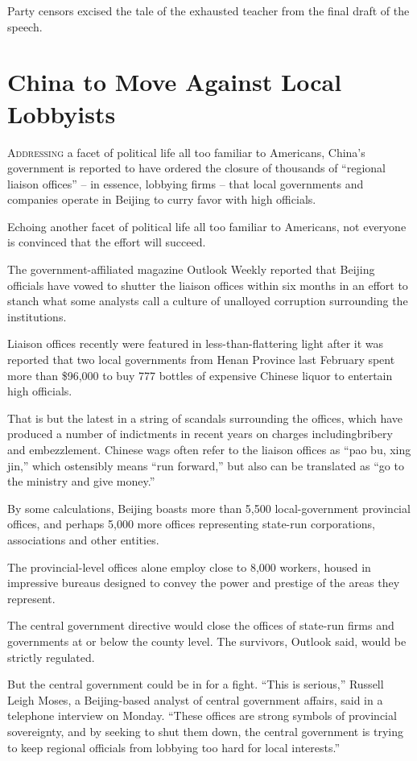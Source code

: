 ﻿\documentclass[12pt]{article}
\begin{document}
Party censors excised the tale of the exhausted teacher from the final draft of the speech.

\section{China to Move Against Local Lobbyists}

\lettrine{A}{ddressing} a facet of political life all too familiar to
Americans, China's government is reported to have ordered the closure of thousands of ``regional
liaison offices'' -- in essence, lobbying firms -- that local governments and companies operate in
Beijing to curry favor with high officials.

Echoing another facet of political life all too familiar to Americans, not everyone is convinced
that the effort will succeed.

The government-affiliated magazine Outlook Weekly reported that Beijing officials have vowed to
shutter the liaison offices within six months in an effort to stanch what some analysts call a
culture of unalloyed corruption surrounding the institutions.

Liaison offices recently were featured in less-than-flattering light after it was reported that two
local governments from Henan Province last February spent more than \$96,000 to buy 777 bottles of
expensive Chinese liquor to entertain high officials.

That is but the latest in a string of scandals surrounding the offices, which have produced a number
of indictments in recent years on charges includingbribery and embezzlement. Chinese wags often
refer to the liaison offices as ``pao bu, xing jin,'' which ostensibly means ``run forward,'' but
also can be translated as ``go to the ministry and give money.''

By some calculations, Beijing boasts more than 5,500 local-government provincial offices, and
perhaps 5,000 more offices representing state-run corporations, associations and other entities.

The provincial-level offices alone employ close to 8,000 workers, housed in impressive bureaus
designed to convey the power and prestige of the areas they represent.

The central government directive would close the offices of state-run firms and governments at or
below the county level. The survivors, Outlook said, would be strictly regulated.

But the central government could be in for a fight. ``This is serious,'' Russell Leigh Moses, a
Beijing-based analyst of central government affairs, said in a telephone interview on Monday.
``These offices are strong symbols of provincial sovereignty, and by seeking to shut them down, the
central government is trying to keep regional officials from lobbying too hard for local
interests.''
\end{document}
